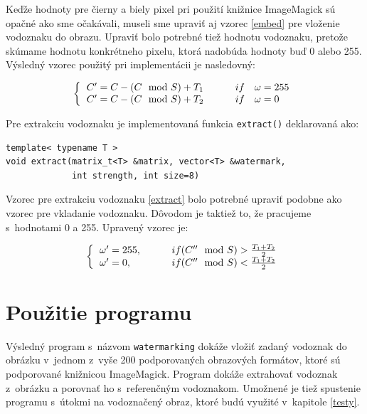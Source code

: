 Keďže hodnoty pre čierny a biely pixel pri použití knižnice ImageMagick sú opačné ako sme očakávali, museli sme upraviť aj vzorec \ref{embed} pre vloženie vodoznaku do obrazu. Upraviť bolo potrebné tiež hodnotu vodoznaku, pretože skúmame hodnotu konkrétneho pixelu, ktorá nadobúda hodnoty buď 0 alebo 255. Výsledný vzorec použitý pri implementácii je nasledovný:

\begin{equation} \label{embed-mod}
\left \{
  \begin{tabular}{ll}
  $C' = C - (C\mod S) + T_1 \qquad$ & $if \quad \omega = 255$ \\
  $C' = C - (C\mod S) + T_2 \qquad$ & $if \quad \omega = 0$
  \end{tabular}
\right.
\end{equation}

Pre extrakciu vodoznaku je implementovaná funkcia {\tt extract()} deklarovaná ako:
\begin{lstlisting}
template< typename T >
void extract(matrix_t<T> &matrix, vector<T> &watermark,
             int strength, int size=8)
\end{lstlisting}

Vzorec pre extrakciu vodoznaku \ref{extract} bolo potrebné upraviť podobne ako vzorec pre vkladanie vodoznaku. Dôvodom je taktiež to, že pracujeme s~hodnotami 0 a 255. Upravený vzorec je:

\begin{equation} \label{extract-mod}
\left \{
  \begin{tabular}{ll}
  $\omega' = 255,\qquad$ & $if (C''\mod S) > \frac{T_1+T_2}{2}$ \\
  $\omega' = 0,\qquad$  & $if (C''\mod S) < \frac{T_1+T_2}{2}$
  \end{tabular}
\right.
\end{equation}

\section{Použitie programu}
\label{impl:help}
Výsledný program s~názvom {\tt watermarking} dokáže vložiť zadaný vodoznak do obrázku v~jednom z~vyše 200 podporovaných obrazových formátov, ktoré sú podporované knižnicou ImageMagick. Program dokáže extrahovať vodoznak z~obrázku a porovnať ho s~referenčným vodoznakom. Umožnené je tiež spustenie programu s~útokmi na vodoznačený obraz, ktoré budú využité v~kapitole \ref{testy}.

